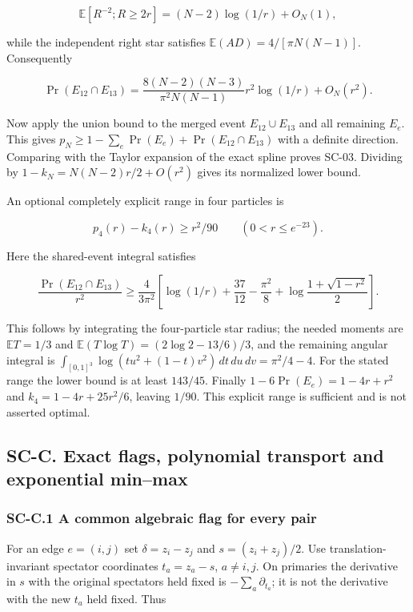 \documentclass[a4paper,11pt]{article}
\numberwithin{equation}{section}
\begin{document}
\[
\mathbb E[R^{-2};R\geq2r]=(N-2)\log(1/r)+O_N(1),
\]

while the independent right star satisfies \(\mathbb E(AD)=4/[\pi N(N-1)]\). Consequently

\[
\Pr(E_{12}\cap E_{13})
=\frac{8(N-2)(N-3)}{\pi^2N(N-1)}
r^2\log(1/r)+O_N(r^2).
\]

Now apply the union bound to the merged event \(E_{12}\cup E_{13}\) and all remaining \(E_e\). This gives \(p_N\geq1-\sum_e\Pr(E_e)+\Pr(E_{12}\cap E_{13})\) with a definite direction. Comparing with the Taylor expansion of the exact spline proves SC-03. Dividing by \(1-k_N=N(N-2)r/2+O(r^2)\) gives its normalized lower bound.

An optional completely explicit range in four particles is

\[
p_4(r)-k_4(r)\geq r^2/90\qquad(0<r\leq e^{-23}).
\]

Here the shared-event integral satisfies

\[
\frac{\Pr(E_{12}\cap E_{13})}{r^2}
\geq\frac4{3\pi^2}
\left[\log(1/r)+\frac{37}{12}-\frac{\pi^2}{8}
+\log\frac{1+\sqrt{1-r^2}}2\right].
\]

This follows by integrating the four-particle star radius; the needed moments are \(\mathbb ET=1/3\) and \(\mathbb E(T\log T)=(2\log2-13/6)/3\), and the remaining angular integral is \(\int_{[0,1]^3}\log(tu^2+(1-t)v^2)\,dt\,du\,dv=\pi^2/4-4\). For the stated range the lower bound is at least \(143/45\). Finally \(1-6\Pr(E_e)=1-4r+r^2\) and \(k_4=1-4r+25r^2/6\), leaving \(1/90\). This explicit range is sufficient and is not asserted optimal.

\hypertarget{sc-c.-exact-flags-polynomial-transport-and-exponential-minmax}{%
\subsection{SC-C. Exact flags, polynomial transport and exponential min--max}\label{sc-c.-exact-flags-polynomial-transport-and-exponential-minmax}}

\hypertarget{sc-c.1-a-common-algebraic-flag-for-every-pair}{%
\subsubsection{SC-C.1 A common algebraic flag for every pair}\label{sc-c.1-a-common-algebraic-flag-for-every-pair}}

For an edge \(e=(i,j)\) set \(\delta=z_i-z_j\) and \(s=(z_i+z_j)/2\). Use translation-invariant spectator coordinates \(t_a=z_a-s\), \(a\ne i,j\). On primaries the derivative in \(s\) with the original spectators held fixed is \(-\sum_a\partial_{t_a}\); it is not the derivative with the new \(t_a\) held fixed. Thus
\end{document}
